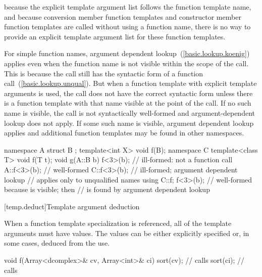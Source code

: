 \pnum
\enternote
because the explicit template argument list follows the function
template name, and because conversion member function templates and
constructor member function templates are called without using a
function name, there is no way to provide an explicit template
argument list for these function templates.
\exitnote

\pnum
\enternote
For simple function names, argument dependent lookup~(\ref{basic.lookup.koenig})
applies even when the function name is not visible within the scope of the call.
This is because the call still has the syntactic form of a function call~(\ref{basic.lookup.unqual}).
But when a function template with explicit template arguments is used,
the call does not have the correct syntactic form unless there is a function
template with that name visible at the point of the call.
If no such name is visible,
the call is not syntactically well-formed and argument-dependent lookup
does not apply.
If some such name is visible,
argument dependent lookup applies and additional function templates
may be found in other namespaces.
\enterexample

\begin{codeblock}
namespace A {
	struct B { };
	template<int X> void f(B);
}
namespace C {
	template<class T> void f(T t);
}
void g(A::B b) {
	f<3>(b);		// ill-formed: not a function call
	A::f<3>(b);		// well-formed
	C::f<3>(b);		// ill-formed; argument dependent lookup
				// applies only to unqualified names
	using C::f;
	f<3>(b);		// well-formed because  is visible; then
				//  is found by argument dependent lookup
}
\end{codeblock}
\exitexampleb
\exitnoteb

[temp.deduct]{Template argument deduction}

\pnum
When a function template specialization is referenced, all of the
template arguments must have values. The values can be
either explicitly specified or, in some cases, deduced from the use.
\enterexample

\begin{codeblock}
void f(Array<dcomplex>& cv, Array<int>& ci)
{
	sort(cv);		// calls 
	sort(ci);		// calls 
}
\end{codeblock}

